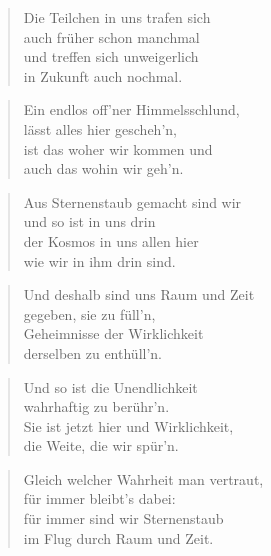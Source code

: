 \documentclass[10pt,a4paper]{article}
\begin{document}
\begin{multicols}{2}
\begin{verse}
Die Teilchen in uns trafen sich \\
auch früher schon manchmal \\
und treffen sich unweigerlich \\
in Zukunft auch nochmal. \\
\end{verse}

\begin{verse}
Ein endlos off’ner Himmelsschlund, \\
lässt alles hier gescheh’n, \\
ist das woher wir kommen und \\
auch das wohin wir geh’n. \\
\end{verse}

\begin{verse}
Aus Sternenstaub gemacht sind wir \\
und so ist in uns drin \\
der Kosmos in uns allen hier \\
wie wir in ihm drin sind. \\
\end{verse}

\begin{verse}
Und deshalb sind uns Raum und Zeit \\
gegeben, sie zu füll’n, \\
Geheimnisse der Wirklichkeit \\
derselben zu enthüll’n. \\
\end{verse}

\begin{verse}
Und so ist die Unendlichkeit \\
wahrhaftig zu berühr’n. \\
Sie ist jetzt hier und Wirklichkeit, \\
die Weite, die wir spür’n. \\
\end{verse}

\begin{verse}
Gleich welcher Wahrheit man vertraut, \\
für immer bleibt’s dabei: \\
für immer sind wir Sternenstaub \\
im Flug durch Raum und Zeit. \\
\end{verse}

\end{multicols}
\end{document}
